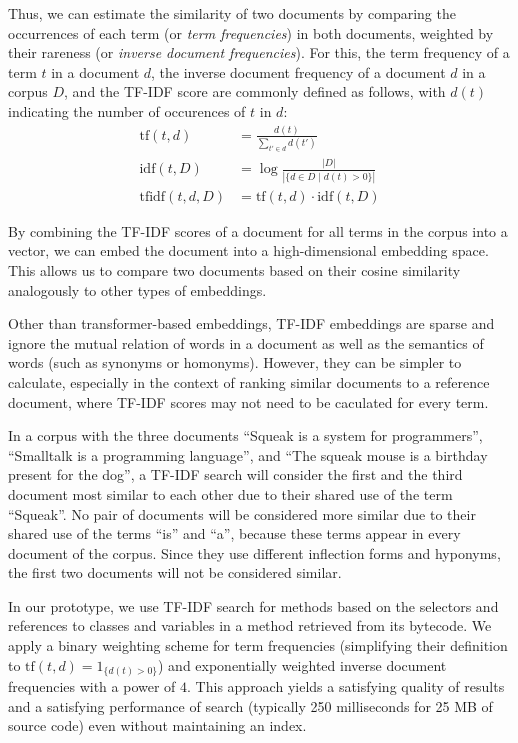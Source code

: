 Thus, we can estimate the similarity of two documents by comparing the occurrences of each term (or \emph{term frequencies}) in both documents, weighted by their rareness (or \emph{inverse document frequencies}).
For this, the term frequency of a term $t$ in a document $d$, the inverse document frequency of a document $d$ in a corpus $D$, and the TF-IDF score are commonly defined as follows, with $d(t)$ indicating the number of occurences of $t$ in $d$:
\begin{align}
	\text{tf}(t, d)	&= \frac{d(t)}{\sum_{t' \in d} d(t')} \\
	\text{idf}(t, D)	&= \log \frac{|D|}{|\{d \in D \mid d(t) > 0\}|} \\
	\text{tfidf}(t, d, D)	&= \text{tf}(t, d) \cdot \text{idf}(t, D)
\end{align}

By combining the TF-IDF scores of a document for all terms in the corpus into a vector, we can embed the document into a high-dimensional embedding space.
This allows us to compare two documents based on their cosine similarity analogously to other types of embeddings.

Other than transformer-based embeddings, TF-IDF embeddings are sparse and ignore the mutual relation of words in a document as well as the semantics of words (such as synonyms or homonyms).
However, they can be simpler to calculate, especially in the context of ranking similar documents to a reference document, where TF-IDF scores may not need to be caculated for every term.

\begin{example}
	In a corpus with the three documents ``Squeak is a system for programmers'', ``Smalltalk is a programming language'', and ``The squeak mouse is a birthday present for the dog'', a TF-IDF search will consider the first and the third document most similar to each other due to their shared use of the term ``Squeak''.
	No pair of documents will be considered more similar due to their shared use of the terms ``is'' and ``a'', because these terms appear in every document of the corpus.
	Since they use different inflection forms and hyponyms, the first two documents will not be considered similar.
\end{example}

In our prototype, we use TF-IDF search for methods based on the selectors and references to classes and variables in a method retrieved from its bytecode.
We apply a binary weighting scheme for term frequencies (simplifying their definition to $\text{tf}(t, d) = 1_{\{d(t) > 0\}}$) and exponentially weighted inverse document frequencies with a power of $4$.
This approach yields a satisfying quality of results and a satisfying performance of search (typically 250 milliseconds for 25 MB of source code) even without maintaining an index.

